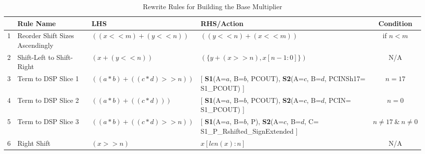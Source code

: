\begin{table}[t]
\caption{Rewrite Rules for Building the Base Multiplier}
\label{table_rewrite}
\centering
\begin{tabularx}{\textwidth}{cXXXc}
\toprule
\textbf{}&\textbf{Rule Name}&\textbf{LHS}&\textbf{RHS/Action}&\textbf{Condition}\\
\midrule

1&Reorder Shift Sizes Ascendingly &$((x << m) + (y << n))$&$((y << n) + (x <<m))$&if $n<m$\\
\midrule
2&Shift-Left to Shift-Right &$(x + (y << n) )$&$(\{ y + (x >> n) , x[n-1:0]\})$&N/A\\
\midrule
3&Term to DSP Slice 1 &$((a*b) + ((c*d) >> n))$&[ \textbf{S1}(A=$a$, B=$b$, PCOUT), \textbf{S2}(A=$c$, B=$d$, PCINSh17= S1\_PCOUT) ]& $n=17$\\
\midrule
4&Term to DSP Slice 2&$((a*b) + ((c*d)))$&[ \textbf{S1}(A=$a$, B=$b$, PCOUT), \textbf{S2}(A=$c$, B=$d$, PCIN= S1\_PCOUT) ]& $n=0$\\
\midrule
5&Term to DSP Slice 3&$((a*b) + ((c*d) >> n))$&[ \textbf{S1}(A=$a$, B=$b$, P), \textbf{S2}(A=$c$, B=$d$, C= S1\_P\_Rshifted\_SignExtended ]& $n\neq17\ \&\ n\neq 0$\\
\midrule
6&Right Shift &$(x >> n)$&$x[len(x):n]$& N/A\\

\bottomrule
\end{tabularx}
\end{table}




